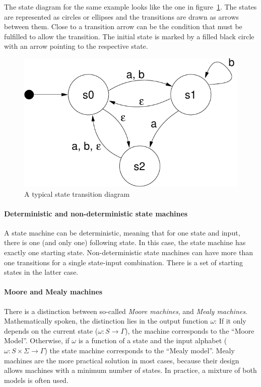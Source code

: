 \documentclass[a4paper,12pt,BCOR6mm,bibtotoc,idxtotoc]{scrbook}
\begin{document}
The state diagram for the same example looks like the one in
figure~\ref{fig:statetrans}. The states are represented as circles or
ellipses and the transitions are drawn as arrows between them. Close
to a transition arrow can be the condition that must be fulfilled to
allow the transition. The initial state is marked by a filled black
circle with an arrow pointing to the respective state.

\begin{figure}[htbp]
  \centering
  \includegraphics[width=.5\textwidth]{images/statetrans}
  \caption{A typical state transition diagram}
  \label{fig:statetrans}
\end{figure}

\paragraph{Deterministic and non-deterministic state machines}

A state machine can be deterministic, meaning that for one state and
input, there is one (and only one) following state. In this case, the
state machine has exactly one starting state. Non-deterministic state
machines can have more than one transitions for a single state-input
combination. There is a set of starting states in the latter case.

\paragraph{Moore and Mealy machines}

There is a distinction between so-called \textit{Moore machines}, and
\textit{Mealy machines}. Mathematically spoken, the distinction lies
in the output function $\omega$: If it only depends on the current
state ($\omega: S \rightarrow \Gamma$), the machine corresponds to the
``Moore Model''. Otherwise, if $\omega$ is a function of a state and
the input alphabet ($\omega: S \times \Sigma \rightarrow \Gamma$) the
state machine corresponds to the ``Mealy model''. Mealy machines are
the more practical solution in most cases, because their design allows
machines with a minimum number of states. In practice, a mixture of
both models is often used.
\end{document}
